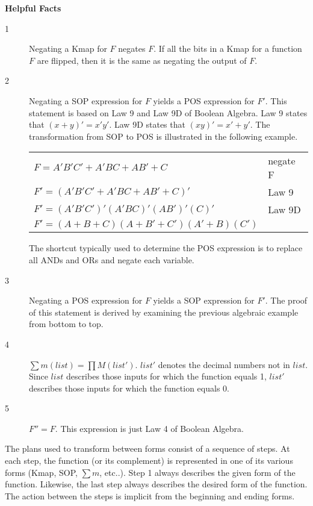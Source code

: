\textbf{Helpful Facts}

\begin{description}
\item [1]
Negating a Kmap for $F$ negates $F$.  If all the
bits in a Kmap for a function $F$ are flipped, then it is
the same as negating the output of $F$.

\item [2] 
Negating a SOP expression for $F$ yields a POS
\label{page:second} expression for $F'$.  This statement is
based on Law 9 and Law 9D of Boolean Algebra.  Law 9 states that
$(x+y)' = x'y'$.  Law 9D states that $(xy)' = x'+y'$.
The transformation from SOP to POS is illustrated
in the following example.

\begin{tabular}[ht]{ll}
    $F  = A'B'C' + A'BC + AB' + C$      & negate F \\
    $F' = (A'B'C' + A'BC + AB' + C)'$   & Law 9 \\
    $F' = (A'B'C')'(A'BC)'(AB')'(C)'$   & Law 9D \\
    $F' = (A+B+C)(A+B'+C')(A'+B)(C')$  \\
\end{tabular}

The shortcut typically used to determine the POS expression
is to replace all ANDs and ORs and negate each variable.

\item [3] 
Negating a POS expression for $F$ yields a SOP
expression for $F'$.  The proof of this statement is
derived by examining the previous algebraic example from
bottom to top.

\item [4] 
$\sum m(list) = \prod M(list')$.  $list'$
denotes the decimal numbers not in $list$.  Since $list$
describes those inputs for which the function equals 1,
$list'$ describes those inputs for which the function
equals 0.

\item [5] $F'' = F$.  
This expression is just Law 4 of Boolean Algebra.
\end{description}

The plans used to transform between forms consist
of a sequence of steps.  At each step, the function
(or its complement) is represented in one
of its various forms (Kmap, SOP, $\sum m$, etc..).
Step 1 always describes the given form of the function.
Likewise, the last step always describes the desired form
of the function.  The action between the steps is implicit
from the beginning and ending forms.

